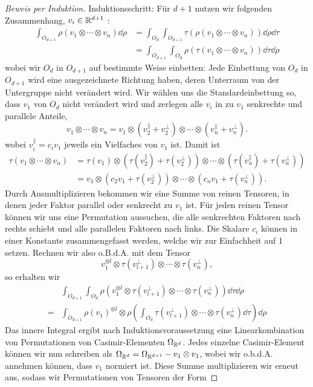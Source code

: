 \begin{proof}[Beweis per Induktion]
\medbreak
Induktionsschritt: Für $d+1$ nutzen wir folgenden Zusammenhang, $ v_i\in\mathbb{R}^{d+1}$ :
\begin{align*}
\int_{O_{d+1}} \rho (v_1\otimes\cdots \otimes v_n) \dd \rho &= \int_{O_{d}} \int_{O_{d+1}} \tau(\rho (v_1\otimes\cdots \otimes v_n)) \dd \rho \dd \tau \\
&=  \int_{O_{d+1}} \int_{O_{d}} \rho(\tau (v_1\otimes\cdots \otimes v_n)) \dd \tau \dd \rho
\end{align*}
wobei wir $O_d$ in $O_{d+1}$ auf bestimmte Weise einbetten: Jede Einbettung von $O_d$ in $O_{d+1}$ wird eine ausgezeichnete Richtung haben, deren Unterraum von der Untergruppe nicht verändert wird. Wir wählen uns die Standardeinbettung so, dass $v_1$ von $O_d$ nicht verändert wird und zerlegen alle $v_i$ in zu $v_1$ senkrechte und parallele Anteile,
\[
v_1\otimes\cdots \otimes v_n = v_1 \otimes (v_2^\parallel + v_2^\perp)\otimes \cdots \otimes (v_n^\parallel + v_n^\perp) .
\]
wobei $v_i^\parallel=c_i v_1$ jeweils ein Vielfaches von $v_1$ ist. Damit ist
\begin{align*}
\tau(v_1\otimes\cdots \otimes v_n) &= \tau(v_1) \otimes (\tau(v_2^\parallel) + \tau(v_2^\perp))\otimes \cdots \otimes (\tau(v_n^\parallel) + \tau(v_n^\perp)) \\
&= v_1 \otimes (c_2 v_1 + \tau(v_2^\perp))\otimes \cdots \otimes (c_n v_1 + \tau(v_n^\perp)) .
\end{align*}
Durch Ausmultiplizieren bekommen wir eine Summe von reinen Tensoren, in denen jeder Faktor parallel oder senkrecht zu $v_1$ ist. Für jeden reinen Tensor können wir uns eine Permutation aussuchen, die alle senkrechten Faktoren nach rechts schiebt und alle parallelen Faktoren nach links. Die Skalare $c_i$ können in einer Konstante zusammengefasst werden, welche wir zur Einfachheit auf 1 setzen. Rechnen wir also o.B.d.A. mit dem Tensor
\[
 v_1^{\otimes l} \otimes \tau(v_{l+1}^\perp) \otimes \cdots \otimes \tau(v_n^\perp),
\] 
so erhalten wir
\begin{align*}
	&\int_{O_{d+1}} \int_{O_{d}} \rho\left(v_1^{\otimes l} \otimes \tau(v_{l+1}^\perp) \otimes \cdots \otimes \tau(v_n^\perp)\right) \dd \tau \dd \rho \\
	= &\int_{O_{d+1}} \rho(v_1)^{\otimes l}\otimes \rho\left(\int_{O_{d}}\tau(v_{l+1}^\perp) \otimes \cdots \otimes \tau(v_n^\perp) \dd \tau \right) \dd \rho
\end{align*}
Das innere Integral ergibt nach Induktionsvoraussetzung eine Linearkombination von Permutationen von Casimir-Elementen $\Omega_{\mathbb{R}^d}$. Jedes einzelne Casimir-Element können wir nun schreiben als $\Omega_{\mathbb{R}^d} = \Omega_{\mathbb{R}^{d+1}} - v_1 \otimes v_1$, wobei wir o.b.d.A. annehmen können, dass $v_1$ normiert ist. Diese Summe multiplizieren wir erneut aus, sodass wir Permutationen von Tensoren der Form

\end{proof}
